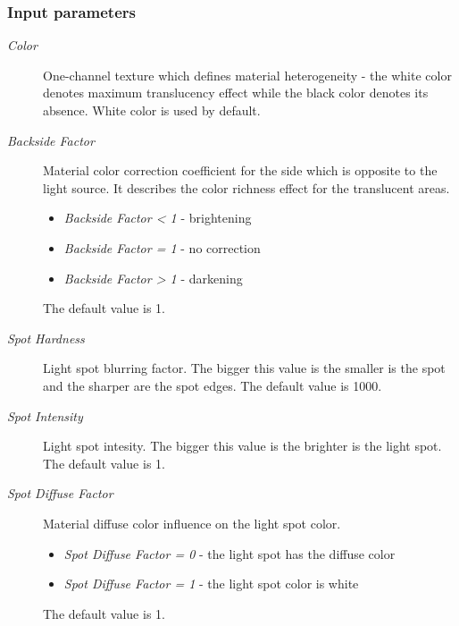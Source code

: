 \documentclass[a4paper,12pt,oneside]{sphinxmanual}
\begin{document}
\subsubsection{Input parameters}
\label{node_materials:id6}\begin{description}
\item[{\emph{Color}}] \leavevmode
One-channel texture which defines material heterogeneity - the white color denotes maximum translucency effect while the black color denotes its absence. White color is used by default.

\item[{\emph{Backside Factor}}] \leavevmode
Material color correction coefficient for the side which is opposite to the light source. It describes the color richness effect for the translucent areas.
\begin{itemize}
\item {} 
\emph{Backside Factor \textless{} 1} - brightening

\item {} 
\emph{Backside Factor = 1} - no correction

\item {} 
\emph{Backside Factor \textgreater{} 1} - darkening

\end{itemize}

The default value is 1.

\item[{\emph{Spot Hardness}}] \leavevmode
Light spot blurring factor. The bigger this value is the smaller is the spot and the sharper are the spot edges. The default value is 1000.

\item[{\emph{Spot Intensity}}] \leavevmode
Light spot intesity. The bigger this value is the brighter is the light spot. The default value is 1.

\item[{\emph{Spot Diffuse Factor}}] \leavevmode
Material diffuse color influence on the light spot color.
\begin{itemize}
\item {} 
\emph{Spot Diffuse Factor = 0} - the light spot has the diffuse color

\item {} 
\emph{Spot Diffuse Factor = 1} - the light spot color is white

\end{itemize}

The default value is 1.

\end{description}
\end{document}
